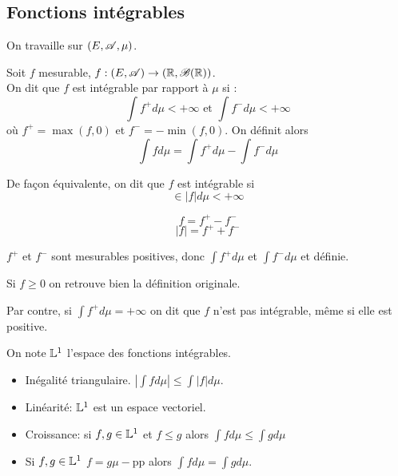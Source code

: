 \subsection{Fonctions intégrables}

On travaille sur $(E, \mathscr{A}, \mu)$.

\begin{definition}
	Soit $f$ mesurable, $f : (E, \mathscr{A}) \to (\mathbb{R}, \mathscr{B}(\mathbb{R}))$.\\
	On dit que $f$ est intégrable par rapport à $\mu$ si :
	$$\int f^+ d\mu < +\infty \text{ et } \int f^- d\mu < +\infty$$
	où $f^+ = \max(f,0)$ et $f^- = -\min(f,0)$.
	On définit alors
	$$ \int f d\mu = \int f^+ d\mu - \int f^- d\mu $$
\end{definition}

\begin{remarque}
	De façon équivalente, on dit que $f$ est intégrable si
	$$ \in |f| d\mu < +\infty$$
\end{remarque}

\begin{remarque}
	$$ f = f^+ - f^- $$
	$$ |f| = f^+ + f^- $$
\end{remarque}

\begin{remarque}
	$f^+$ et $f^-$ sont mesurables positives, donc $\int f^+d\mu$ et $\int f^- d\mu$ et définie.
\end{remarque}

\begin{remarque}
	Si $f \geq 0$ on retrouve bien la définition originale.
\end{remarque}

\begin{remarque}
	Par contre, si $\int f^+ d\mu = +\infty$ on dit que $f$ n'est pas intégrable, même si elle est positive.
\end{remarque}


\begin{definition}
	On note $\mathbb{L}^1$ l'espace des fonctions intégrables.
\end{definition}

\begin{prop}
	\begin{itemize}
		\item Inégalité triangulaire. $\left| \int f d\mu \right| \leq \int |f| d \mu$.
		\item Linéarité: $\mathbb{L}^1$ est un espace vectoriel.
		\item Croissance: si $f,g \in \mathbb{L}^1$ et $f\leq g$ alors $\int f d\mu \leq \int g d\mu$
		\item Si $f,g \in \mathbb{L}^1$ $f = g \mu-$pp alors $\int f d\mu = \int g d\mu$.
	\end{itemize}
\end{prop}

